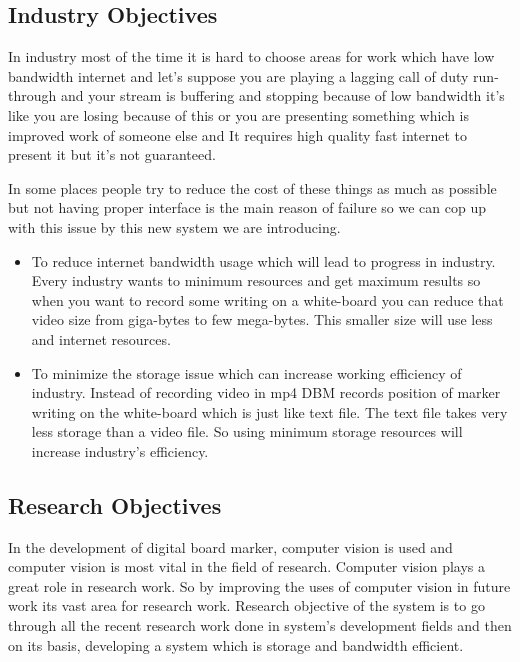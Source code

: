 \subsection{Industry Objectives}
In industry most of the time it is hard to choose areas for work which have low bandwidth internet and let's suppose you are playing a lagging call of duty run-through and your stream is buffering and stopping because of low bandwidth it's like you are losing because of this or you are presenting something which is improved work of someone else and It requires high quality fast internet to present it but it's not guaranteed.
\par In some places people try to reduce the cost of these things as much as possible but not having proper interface is the main reason of failure so we can cop up with this issue by this new system we are introducing.

\begin{itemize}

\item To reduce internet bandwidth usage which will lead to progress in industry. Every industry wants to minimum resources and get maximum results so when you want to record some writing on a white-board you can reduce that video size from giga-bytes to few mega-bytes. This smaller size will use less and internet resources.
\item To minimize the storage issue which can increase working efficiency of industry. Instead of recording video in mp4 DBM records position of marker writing on the white-board which is just like text file. The text file takes very less storage than a video file. So using minimum storage resources will increase industry's efficiency.

\end{itemize}

\bigskip

\subsection{Research Objectives}
In the development of digital board marker, computer vision is used and computer vision is most vital in the field of research. Computer vision plays a great role in research work. So by improving the uses of computer vision in future work its vast area for research work.
Research objective of the system is to go through all the recent research work done in system's development fields and then on its basis, developing a system which is storage and bandwidth efficient.

